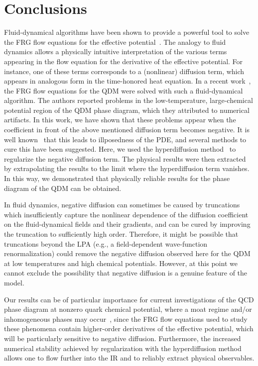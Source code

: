 \documentclass[
onecolumn,
aps,
prd,
amsmath,
amssymb,
nofootinbib
]{revtex4-2}
\begin{document}
\section{Conclusions}
\label{sec:conclusions}

Fluid-dynamical algorithms have been shown to provide a powerful tool to solve the FRG flow equations for the effective potential~\cite{Grossi:2019urj,Koenigstein:2021syz,Sattler:2025hcg}.
The analogy to fluid dynamics allows a physically intuitive interpretation of the various terms appearing in the flow equation for the derivative of the effective potential.
For instance, one of these terms corresponds to a (nonlinear) diffusion term, which appears in analogous form in the time-honored heat equation.
In a recent work~\cite{stoll2025nonperturbative}, the FRG flow equations for the QDM were solved with such a fluid-dynamical algorithm.
The authors reported problems in the low-temperature, large-chemical potential region of the QDM phase diagram, which they attributed to numerical artifacts.
In this work, we have shown that these problems appear when the coefficient in front of the above mentioned diffusion term becomes negative. 
It is well known~\cite{Tikhonov1995} that this leads to illposedness of the PDE, and several methods to cure this have been suggested.
Here, we used the hyperdiffusion method~\cite{witelski1995shocks,miller2025shock,Maron:2008sb} to regularize the negative diffusion term.
The physical results were then extracted by extrapolating the results to the limit where the hyperdiffusion term vanishes.
In this way, we demonstrated that physically reliable results for the phase diagram of the QDM can be obtained.



In fluid dynamics, negative diffusion can sometimes be caused by truncations which insufficiently capture the nonlinear dependence of the diffusion coefficient on the fluid-dynamical fields and their gradients, and can be cured by improving the truncation to sufficiently high order. 
Therefore, it might be possible that truncations beyond the LPA (e.g., a field-dependent wave-function renormalization) could remove the negative diffusion observed here for the QDM at low temperatures and high chemical potentials. 
However, at this point we cannot exclude the possibility that negative diffusion is a genuine feature of the model.

Our results can be of particular importance for current investigations of the QCD phase diagram at nonzero quark chemical potential, where a moat regime and/or inhomogeneous phases may occur~\cite{Pisarski:2021qof,Motta:2024rvk,Fu:2024rto,pawlowski2025inhomogeneousinstabilitieshighdensityqcd}, since the FRG flow equations used to study these phenomena contain higher-order derivatives of the effective potential, which will be particularly sensitive to negative diffusion. 
Furthermore, the increased numerical stability achieved by regularization with the hyperdiffusion method allows one to flow further into the IR and to reliably extract physical observables.  
\end{document}
